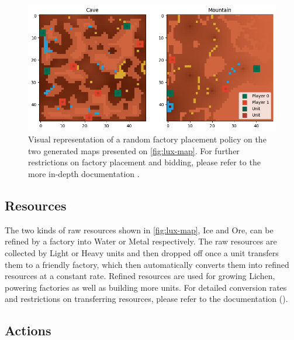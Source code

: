 \begin{figure}[htbp]
    \centering
    \includegraphics[width=1\linewidth]{images/intro_luxenv/map/factories_units.png}
    \captionsetup{justification=justified, singlelinecheck=false, width=1\linewidth, labelfont=bf}    
    \caption{Visual representation of a random factory placement policy on the two generated maps presented on \textcolor{deepblue}{\autoref{fig:lux-map}}. For further restrictions on factory placement and bidding, please refer to the more in-depth documentation \protect\footnotemark.}
    \label{fig:lux-map2}
\end{figure}


\subsection{Resources}

\noindent The two kinds of raw resources shown in \textcolor{deepblue}{\autoref{fig:lux-map}}, Ice and Ore, can be refined by a factory into Water or Metal respectively. The raw resources are collected by Light or Heavy units and then dropped off once a unit transfers them to a friendly factory, which then automatically converts them into refined resources at a constant rate. Refined resources are used for growing Lichen, powering factories as well as building more units. For detailed conversion rates and restrictions on transferring resources, please refer to the documentation (\textcolor{deepblue}{\cite{lux-ai-season-2}}).

\subsection{Actions}
\label{subsec:lux-action}


